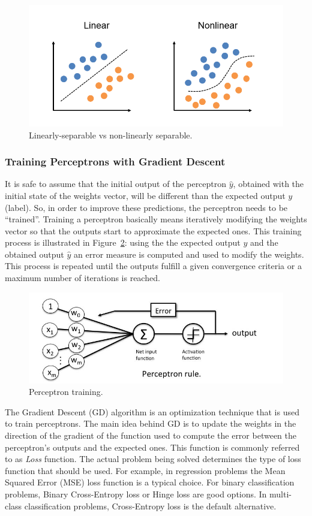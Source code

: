 \begin{figure}[!htbp]
    \centering
    \includegraphics[width=.5\textwidth]{Images/linear_vs_non_linear.png}
    \caption{Linearly-separable vs non-linearly separable.}
    \label{fig:linear_vs_non_linear}
\end{figure}

\subsubsection{Training Perceptrons with Gradient Descent}
 
It is safe to assume that the initial output of the perceptron $\hat{y}$, obtained with the initial state of the weights vector, will be different than the expected output $y$ (label). So, in order to improve these predictions, the perceptron needs to be ``trained''. Training a perceptron basically means iteratively modifying the weights vector so that the outputs start to approximate the expected ones. This training process is illustrated in Figure~\ref{fig:perceptron_train}: using the the expected output $y$ and the obtained output $\hat{y}$ an error measure is computed and used to modify the weights. This process is repeated until the outputs fulfill a  given convergence criteria or a maximum number of iterations is reached.
 
\begin{figure}[!htbp]
    \centering
    \includegraphics[width=.5\textwidth]{Images/perceptron_learning.jpg}
    \caption{Perceptron training.}
    \label{fig:perceptron_train}
\end{figure}

The Gradient Descent (GD) algorithm is an optimization technique that is used to train perceptrons. The main idea behind GD is to update the weights in the direction of the gradient of the function used to compute the error between the perceptron's outputs and the expected ones. This function is commonly referred to as \textit{Loss} function. The actual problem being solved determines the type of loss function that should be used. For example, in regression problems the Mean Squared Error (MSE) loss function is a typical choice. For binary classification problems, Binary Cross-Entropy loss or Hinge loss are good options. In multi-class classification problems, Cross-Entropy loss is the default alternative.

